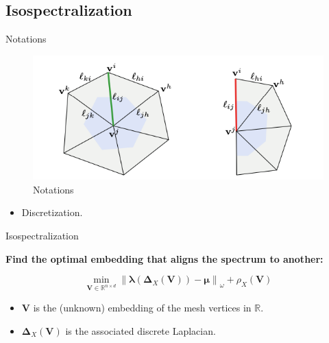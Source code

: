 \documentclass{beamer}
\begin{document}
\subsection{Isospectralization}

\begin{frame}{Notations}
\begin{figure}
 \includegraphics[width=\textwidth]{notations}
 \caption{\label{fig:notations}Notations}
\end{figure}
\begin{itemize}
    \item Discretization.
\end{itemize}
\end{frame}

\begin{frame}{Isospectralization}

\textbf{Find the optimal embedding that aligns the spectrum to another:}

 $$ \min _{\mathbf{V} \in \mathbb{R}^{n \times d}}\left\|\boldsymbol{\lambda}\left(\boldsymbol{\Delta}_{X}(\mathbf{V})\right)-\boldsymbol{\mu}\right\|_{\omega}+\rho_{X}(\mathbf{V}) $$

\vskip 0.5cm

    \begin{itemize}
        \item $\mathbf{V}$ is the (unknown) embedding of the mesh vertices in $\mathbb{R}$.
        \item $\boldsymbol{\Delta}_{X}(\mathbf{V})$ is the associated discrete Laplacian.
    \end{itemize}
    
\end{frame}
\end{document}

